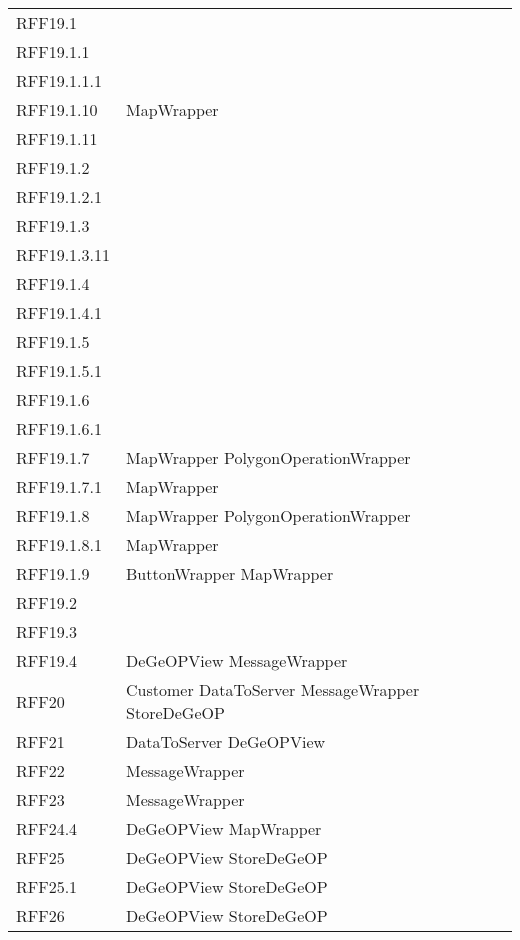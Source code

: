 \begin{longtable}{p{2.5cm}!{\VRule[1pt]}p{5cm}}
	RFF19.1 & \\
	RFF19.1.1 & \\
	RFF19.1.1.1 & \\
	RFF19.1.10 & MapWrapper\\
	RFF19.1.11 & \\
	RFF19.1.2 & \\
	RFF19.1.2.1 & \\
	RFF19.1.3 & \\
	RFF19.1.3.11 & \\
	RFF19.1.4 & \\
	RFF19.1.4.1 & \\
	RFF19.1.5 & \\
	RFF19.1.5.1 & \\
	RFF19.1.6 & \\
	RFF19.1.6.1 & \\
	RFF19.1.7 & MapWrapper \newline PolygonOperationWrapper\\
	RFF19.1.7.1 & MapWrapper\\
	RFF19.1.8 & MapWrapper \newline PolygonOperationWrapper\\
	RFF19.1.8.1 & MapWrapper\\
	RFF19.1.9 & ButtonWrapper \newline MapWrapper\\
	RFF19.2 & \\
	RFF19.3 & \\
	RFF19.4 & DeGeOPView \newline MessageWrapper\\
	RFF20 & Customer \newline DataToServer \newline MessageWrapper \newline StoreDeGeOP\\
	RFF21 & DataToServer \newline DeGeOPView\\
	RFF22 & MessageWrapper\\
	RFF23 & MessageWrapper\\
	RFF24.4 & DeGeOPView \newline MapWrapper\\
	RFF25 & DeGeOPView \newline StoreDeGeOP\\
	RFF25.1 & DeGeOPView \newline StoreDeGeOP\\
	RFF26 & DeGeOPView \newline StoreDeGeOP\\

\end{longtable}
